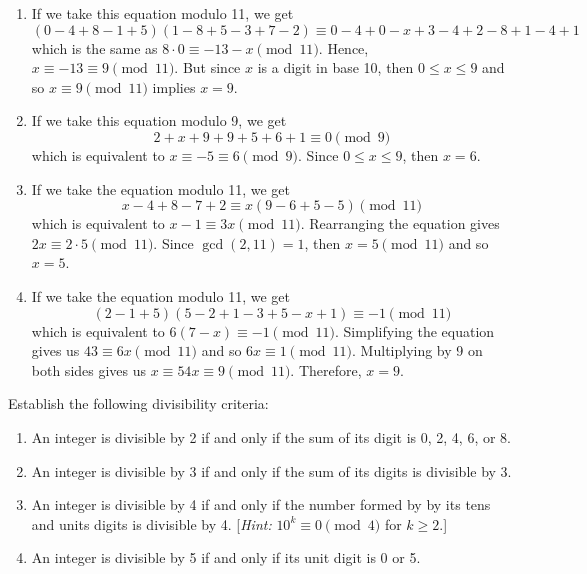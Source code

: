 \begin{solution}
    \begin{enumerate}
        \item If we take this equation modulo 11, we get
        $$(0 - 4 + 8 - 1 + 5)(1 - 8 + 5 - 3 + 7 - 2) \equiv 0 - 4 + 0 - x + 3 - 4 + 2 - 8 + 1 - 4 + 1$$
        which is the same as $8 \cdot 0 \equiv -13 - x \pmod{11}$. Hence, $x \equiv -13 \equiv 9 \pmod{11}$. But since $x$ is a digit in base 10, then $0 \leq x \leq 9$ and so $x \equiv 9 \pmod{11}$ implies $x = 9$.
        \item If we take this equation modulo 9, we get
        $$2 + x + 9 + 9 + 5 + 6 + 1 \equiv 0 \pmod 9$$
        which is equivalent to $x \equiv - 5 \equiv 6 \pmod 9$. Since $0 \leq x \leq 9$, then $x = 6$.
        \item If we take the equation modulo 11, we get
        $$x - 4 + 8 - 7 + 2 \equiv x(9 - 6 + 5 - 5) \pmod{11}$$
        which is equivalent to $x - 1 \equiv 3x \pmod{11}$. Rearranging the equation gives $2x \equiv 2 \cdot 5 \pmod{11}$. Since $\gcd(2, 11) = 1$, then $x = 5 \pmod{11}$ and so $x = 5$.
        \item If we take the equation modulo 11, we get
        $$(2 - 1 + 5)(5 - 2 + 1 - 3 + 5 - x + 1) \equiv -1 \pmod{11}$$
        which is equivalent to $6(7 - x) \equiv -1 \pmod{11}$. Simplifying the equation gives us $43 \equiv 6x \pmod{11}$ and so $6x \equiv 1 \pmod{11}$. Multiplying by 9 on both sides gives us $x \equiv 54x \equiv 9 \pmod{11}$. Therefore, $x = 9$.
    \end{enumerate}
\end{solution}

\begin{exercise}
    Establish the following divisibility criteria:
    \begin{enumerate}
        \item An integer is divisible by 2 if and only if the sum of its digit is 0, 2, 4, 6, or 8.
        \item An integer is divisible by 3 if and only if the sum of its digits is divisible by 3.
        \item An integer is divisible by 4 if and only if the number formed by by its tens and units digits is divisible by 4. [\textit{Hint:} $10^k \equiv 0 \pmod 4$ for $k \geq 2$.]
        \item An integer is divisible by 5 if and only if its unit digit is 0 or 5.
    \end{enumerate}
\end{exercise}

